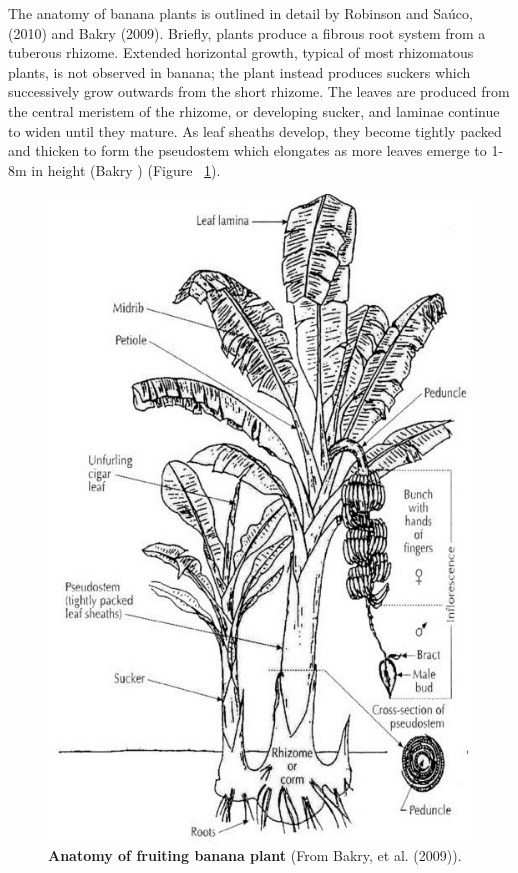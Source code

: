 The anatomy of banana plants is outlined in detail by Robinson and Saúco, (2010) and Bakry \et (2009). Briefly, plants produce a fibrous root system from a tuberous rhizome. Extended horizontal growth, typical of most rhizomatous plants, is not observed in banana; the plant instead produces suckers which successively grow outwards from the short rhizome. The leaves are produced from the central meristem of the rhizome, or developing sucker, and laminae continue to widen until they mature. As leaf sheaths develop, they become tightly packed and thicken to form the pseudostem which elongates as more leaves emerge to 1-8m in height (Bakry ) (Figure ~\ref{fig:Anatomy of fruiting banana plant}). 

\begin{figure}[hp!]
    \centering
    \includegraphics[width=12cm]{Figures/Diagrammatic-representation-of-a-fruiting-banana-plant-with-suckers-in-Bakry-et-al_W640.jpg}
    \caption[Anatomy of fruiting banana plant]{\textbf{Anatomy of fruiting banana plant} (From Bakry, et al. (2009)).}
    \label{fig:Anatomy of fruiting banana plant}
\end{figure}


